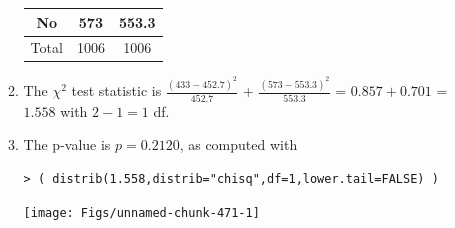 \documentclass[10pt,openany]{book}\usepackage[]{graphicx}\usepackage[]{color}
\makeatletter
\newenvironment{kframe}{%
 \def\at@end@of@kframe{}%
 \ifinner\ifhmode%
  \def\at@end@of@kframe{\end{minipage}}%
  \begin{minipage}{\columnwidth}%
 \fi\fi%
 \def\FrameCommand##1{\hskip\@totalleftmargin \hskip-\fboxsep
 \colorbox{shadecolor}{##1}\hskip-\fboxsep
     \hskip-\linewidth \hskip-\@totalleftmargin \hskip\columnwidth}%
 \MakeFramed {\advance\hsize-\width
   \@totalleftmargin\z@ \linewidth\hsize
   \@setminipage}}%
 {\par\unskip\endMakeFramed%
 \at@end@of@kframe}
\newenvironment{knitrout}{}{} %
\makeatother
\begin{document}
\begin{itemize}
\begin{enumerate}
\begin{center}
\begin{tabular}{ccc}
            No  & 573 & 553.3 \\
            \hline
            Total & 1006 & 1006 \\
            \hline\hline
          \end{tabular}
        \end{center}
      \item The $\chi^{2}$ test statistic is $\frac{(433-452.7)^{2}}{452.7}$ + $\frac{(573-553.3)^{2}}{553.3}$ = $0.857+0.701$ = $1.558$ with $2-1=1$ df.
      \item The p-value is $p=0.2120$, as computed with
\begin{knitrout}
\color{fgcolor}\begin{kframe}
\begin{verbatim}
> ( distrib(1.558,distrib="chisq",df=1,lower.tail=FALSE) )
\end{verbatim}


{\ttfamily\noindent\bfseries\color{errorcolor}{Error in plot.window(...): need finite 'ylim' values}}\end{kframe}

{\centering \texttt{[image: Figs/unnamed-chunk-471-1]} 

}




\end{knitrout}
\end{enumerate}
\end{itemize}
\end{document}
